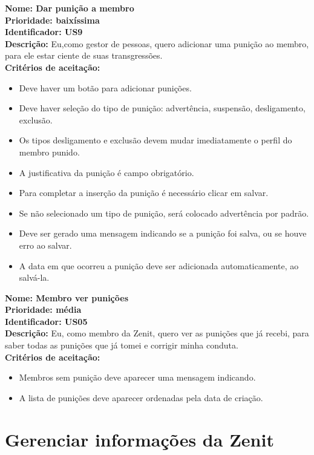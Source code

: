 \begin{anexosenv}
\indent \textbf{Nome: Dar punição a membro\\
\indent Prioridade: baixíssima\\
\indent Identificador: US9\\
\indent Descrição:} Eu,como gestor de pessoas, quero adicionar uma punição ao membro, para ele estar ciente de suas transgressões.\\
\indent \textbf{Critérios de aceitação:}
\begin{itemize}
    \item Deve haver um botão para adicionar punições.
    \item Deve haver seleção do tipo de punição: advertência, suspensão, desligamento, exclusão.
    \item Os tipos desligamento e exclusão devem mudar imediatamente o perfil do membro punido.
    \item A justificativa da punição é campo obrigatório.
    \item Para completar a inserção da punição é necessário clicar em salvar.
    \item Se não selecionado um tipo de punição, será colocado advertência por padrão.
    \item Deve ser gerado uma mensagem indicando se a punição foi salva, ou se houve erro ao salvar.
    \item A data em que ocorreu a punição deve ser adicionada automaticamente, ao salvá-la.
\end{itemize}

\indent \textbf{Nome: Membro ver punições\\
\indent Prioridade: média\\
\indent Identificador: US05\\
\indent Descrição: }Eu, como membro da Zenit, quero ver as punições que já recebi, para saber todas as punições que já tomei e corrigir minha conduta.\\
\indent \textbf{Critérios de aceitação:}
\begin{itemize}
    \item Membros sem punição deve aparecer uma mensagem indicando.
    \item A lista de punições deve aparecer ordenadas pela data de criação.
\end{itemize}


\section{Gerenciar informações da Zenit}

\end{anexosenv}
